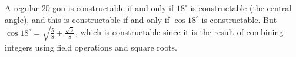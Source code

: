 \documentclass[11pt]{exam}
\begin{document}
\begin{questions}
\begin{solution}
A regular 20-gon is constructable if and only if $18^{\circ}$ is constructable (the central angle), and this is constructable if and only if $\cos 18^{\circ}$ is constructable.  But $\cos 18^{\circ} = \sqrt{\frac{5}{8} + \frac{\sqrt{5}}{8}}$, which is constructable since it is the result of combining integers using field operations and square roots.
\end{solution}

\end{questions}
\end{document}
